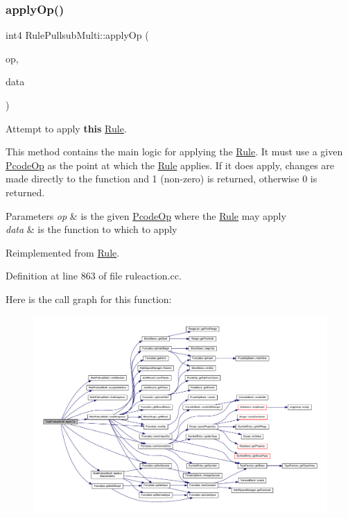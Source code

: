 \subsubsection{\texorpdfstring{applyOp()}{applyOp()}}
{\footnotesize\ttfamily int4 Rule\+Pullsub\+Multi\+::apply\+Op (\begin{DoxyParamCaption}\item[{\mbox{\hyperlink{class_pcode_op}{Pcode\+Op}} $\ast$}]{op,  }\item[{\mbox{\hyperlink{class_funcdata}{Funcdata}} \&}]{data }\end{DoxyParamCaption})\hspace{0.3cm}{\ttfamily [virtual]}}



Attempt to apply {\bfseries{this}} \mbox{\hyperlink{class_rule}{Rule}}. 

This method contains the main logic for applying the \mbox{\hyperlink{class_rule}{Rule}}. It must use a given \mbox{\hyperlink{class_pcode_op}{Pcode\+Op}} as the point at which the \mbox{\hyperlink{class_rule}{Rule}} applies. If it does apply, changes are made directly to the function and 1 (non-\/zero) is returned, otherwise 0 is returned. 
\begin{DoxyParams}{Parameters}
{\em op} & is the given \mbox{\hyperlink{class_pcode_op}{Pcode\+Op}} where the \mbox{\hyperlink{class_rule}{Rule}} may apply \\
\hline
{\em data} & is the function to which to apply \\
\hline
\end{DoxyParams}


Reimplemented from \mbox{\hyperlink{class_rule_a4e3e61f066670175009f60fb9dc60848}{Rule}}.



Definition at line 863 of file ruleaction.\+cc.

Here is the call graph for this function\+:
\nopagebreak
\begin{figure}[H]
\begin{center}
\leavevmode
\includegraphics[width=350pt]{class_rule_pullsub_multi_ae66401a1bda28e0332a3058b276fdca5_cgraph}
\end{center}
\end{figure}
\mbox{\label{class_rule_pullsub_multi_a9195ceded3ce1f8d7d12bb52c8e268db}} 
